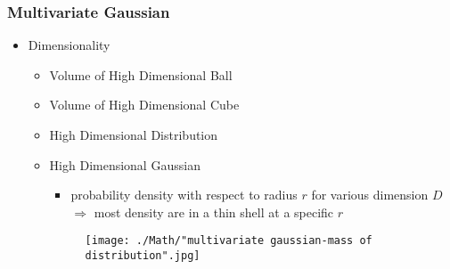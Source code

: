 \subsubsection{Multivariate Gaussian}
\begin{itemize}
\item Dimensionality
	\begin{itemize}
		\item Volume of High Dimensional Ball
		\item Volume of High Dimensional Cube
		\item High Dimensional Distribution
		\item High Dimensional Gaussian
			\begin{itemize}
			\item probability density with respect to radius $r$ for various dimension $D$ \\
				$\Rightarrow$ most density are in a thin shell at a specific $r$			
			\end{itemize}
			\begin{figure}[ht]
			\texttt{[image: ./Math/"multivariate gaussian-mass of distribution".jpg]}
			\end{figure}
		
	\end{itemize}
\end{itemize}

